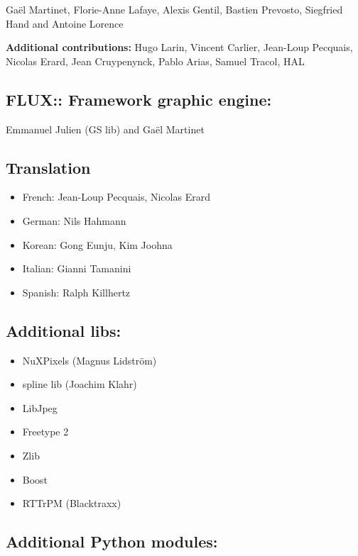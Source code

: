 \documentclass[
  letterpaper,
  DIV=11,
  numbers=noendperiod]{scrreport}
\providecommand{\tightlist}{%
  \setlength{\itemsep}{0pt}\setlength{\parskip}{0pt}}\usepackage{longtable,booktabs,array}
\begin{document}
Gaël Martinet, Florie-Anne Lafaye, Alexis Gentil, Bastien Prevosto,
Siegfried Hand and Antoine Lorence

\textbf{Additional contributions:} Hugo Larin, Vincent Carlier,
Jean-Loup Pecquais, Nicolas Erard, Jean Cruypenynck, Pablo Arias, Samuel
Tracol, HAL

\hypertarget{flux-framework-graphic-engine}{%
\subsection{FLUX:: Framework graphic
engine:}\label{flux-framework-graphic-engine}}

Emmanuel Julien (GS lib) and Gaël Martinet

\hypertarget{translation}{%
\subsection{Translation}\label{translation}}

\begin{itemize}
\tightlist
\item
  French: Jean-Loup Pecquais, Nicolas Erard
\item
  German: Nils Hahmann
\item
  Korean: Gong Eunju, Kim Joohna
\item
  Italian: Gianni Tamanini
\item
  Spanish: Ralph Killhertz
\end{itemize}

\hypertarget{additional-libs}{%
\subsection{Additional libs:}\label{additional-libs}}

\begin{itemize}
\tightlist
\item
  NuXPixels (Magnus Lidström)
\item
  spline lib (Joachim Klahr)
\item
  LibJpeg
\item
  Freetype 2
\item
  Zlib
\item
  Boost
\item
  RTTrPM (Blacktraxx)
\end{itemize}

\hypertarget{additional-python-modules}{%
\subsection{Additional Python
modules:}\label{additional-python-modules}}
\end{document}
